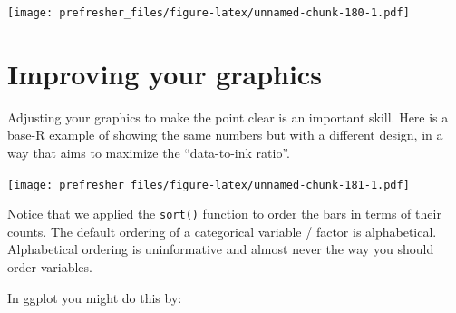 \documentclass[]{book}
\newenvironment{Shaded}{\begin{snugshade}}{\end{snugshade}}
\newcommand{\CommentTok}[1]{\textcolor[rgb]{0.56,0.35,0.01}{\textit{#1}}}
\newcommand{\DataTypeTok}[1]{\textcolor[rgb]{0.13,0.29,0.53}{#1}}
\newcommand{\DecValTok}[1]{\textcolor[rgb]{0.00,0.00,0.81}{#1}}
\newcommand{\KeywordTok}[1]{\textcolor[rgb]{0.13,0.29,0.53}{\textbf{#1}}}
\newcommand{\NormalTok}[1]{#1}
\newcommand{\OperatorTok}[1]{\textcolor[rgb]{0.81,0.36,0.00}{\textbf{#1}}}
\newcommand{\OtherTok}[1]{\textcolor[rgb]{0.56,0.35,0.01}{#1}}
\newcommand{\StringTok}[1]{\textcolor[rgb]{0.31,0.60,0.02}{#1}}
\theoremstyle{definition}
\theoremstyle{definition}
\theoremstyle{definition}
\theoremstyle{remark}
\begin{document}
\texttt{[image: prefresher\_files/figure-latex/unnamed-chunk-180-1.pdf]}

\hypertarget{improving-your-graphics}{%
\section{Improving your graphics}\label{improving-your-graphics}}

Adjusting your graphics to make the point clear is an important skill. Here is a base-R example of showing the same numbers but with a different design, in a way that aims to maximize the ``data-to-ink ratio''.

\begin{Shaded}
\end{Shaded}

\texttt{[image: prefresher\_files/figure-latex/unnamed-chunk-181-1.pdf]}

Notice that we applied the \texttt{sort()} function to order the bars in terms of their counts. The default ordering of a categorical variable / factor is alphabetical. Alphabetical ordering is uninformative and almost never the way you should order variables.

In ggplot you might do this by:
\end{document}
